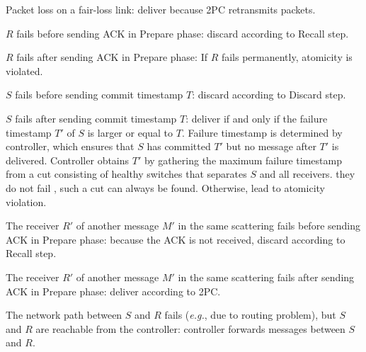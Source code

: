 \begin{ecompact}
	\item Packet loss on a fair-loss link: deliver because 2PC retransmits packets.
	\item $R$ fails before sending ACK in Prepare phase: discard according to Recall step.
	\item $R$ fails after sending ACK in Prepare phase:  If $R$ fails permanently, atomicity is violated.
	\item $S$ fails before sending commit timestamp $T$: discard according to Discard step. 
	\item $S$ fails after sending commit timestamp $T$: deliver if and only if the failure timestamp $T'$ of $S$ is larger or equal to $T$. Failure timestamp is determined by controller, which ensures that $S$ has committed $T'$ but no message after $T'$ is delivered. Controller obtains $T'$ by gathering the maximum failure timestamp from a cut  consisting of healthy switches that separates $S$ and all receivers.  they do not fail , such a cut can always be found. Otherwise,  lead to atomicity violation.
	\item The receiver $R'$ of another message $M'$ in the same scattering fails before sending ACK in Prepare phase: because the ACK is not received, discard according to Recall step.
	\item The receiver $R'$ of another message $M'$ in the same scattering fails after sending ACK in Prepare phase: deliver according to 2PC.
	\item The network path between $S$ and $R$ fails (\textit{e.g.}, due to routing problem), but $S$ and $R$ are reachable from the controller: controller forwards messages between $S$ and $R$.

\end{ecompact}
